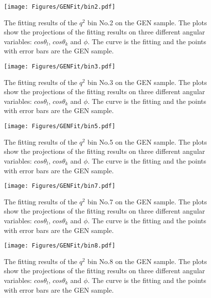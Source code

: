 \begin{figure}[!hbt]
  \centering
  \texttt{[image: Figures/GENFit/bin2.pdf]}
  \caption{The fitting results of the $q^2$ bin No.2 on the GEN
    sample. The plots show the projections of the fitting results on
    three different angular variables: $cos\theta_l$, $cos\theta_k$
    and $\phi$. The curve is the fitting and the points with error
    bars are the GEN  sample. } 
  \label{fig:gen-bin2}
\end{figure}

\begin{figure}[!hbt]
  \centering
  \texttt{[image: Figures/GENFit/bin3.pdf]}
  \caption{The fitting results of the $q^2$ bin No.3 on the GEN
    sample. The plots show the projections of the fitting results on
    three different angular variables: $cos\theta_l$, $cos\theta_k$
    and $\phi$. The curve is the fitting and the points with error
    bars are the GEN  sample. } 
  \label{fig:gen-bin3}
\end{figure}

\begin{figure}[!hbt]
  \centering
  \texttt{[image: Figures/GENFit/bin5.pdf]}
  \caption{The fitting results of the $q^2$ bin No.5 on the GEN
    sample. The plots show the projections of the fitting results on
    three different angular variables: $cos\theta_l$, $cos\theta_k$
    and $\phi$. The curve is the fitting and the points with error
    bars are the GEN  sample. } 
  \label{fig:gen-bin5}
\end{figure}

\begin{figure}[!hbt]
  \centering
  \texttt{[image: Figures/GENFit/bin7.pdf]}
  \caption{The fitting results of the $q^2$ bin No.7 on the GEN
    sample. The plots show the projections of the fitting results on
    three different angular variables: $cos\theta_l$, $cos\theta_k$
    and $\phi$. The curve is the fitting and the points with error
    bars are the GEN  sample. } 
  \label{fig:gen-bin7}
\end{figure}


\begin{figure}[!hbt]
  \centering
  \texttt{[image: Figures/GENFit/bin8.pdf]}
  \caption{The fitting results of the $q^2$ bin No.8 on the GEN
    sample. The plots show the projections of the fitting results on
    three different angular variables: $cos\theta_l$, $cos\theta_k$
    and $\phi$. The curve is the fitting and the points with error
    bars are the GEN  sample. } 
  \label{fig:gen-bin8}
\end{figure}

